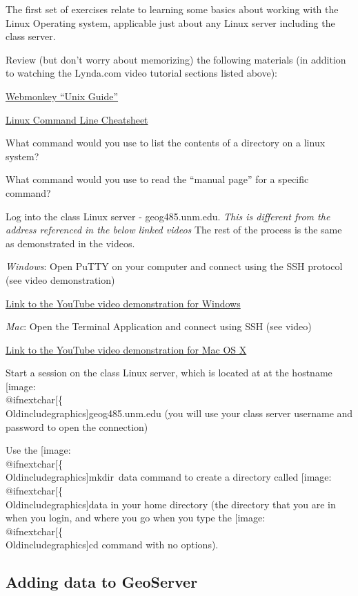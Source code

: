 \documentclass[]{book}
\makeatletter
\providecommand{\tightlist}{%
  \setlength{\itemsep}{0pt}\setlength{\parskip}{0pt}}
\def\ScaleIfNeeded{%
  \ifdim\Gin@nat@width>.5\linewidth
    .5\linewidth
  \else
    \Gin@nat@width
  \fi
}
\let\Oldincludegraphics\texttt{[image: \%
 \\catcode`\\@=11\\relax\%
 \%\\gdef\\includegraphics\{\\@ifnextchar[\{\\Oldincludegraphics]}{\Oldincludegraphics[width=\ScaleIfNeeded]}}%
\gdef\texttt{[image: \\@ifnextchar[\{\\Oldincludegraphics]}{\Oldincludegraphics[max size={.75\textwidth}{.75\textheight}]}}%
\makeatother
\begin{document}
The first set of exercises relate to learning some basics about working
with the Linux Operating system, applicable just about any Linux server
including the class server.

Review (but don't worry about memorizing) the following materials (in
addition to watching the Lynda.com video tutorial sections listed
above):

\href{http://www.webmonkey.com/2010/02/unix-guide/}{Webmonkey ``Unix
Guide''}

\href{http://www.cheatography.com/davechild/cheat-sheets/linux-command-line/}{Linux
Command Line Cheatsheet}

\begin{description}
\tightlist
\item[QUESTION 1]
What command would you use to list the contents of a directory on a
linux system?
\item[QUESTION 2]
What command would you use to read the ``manual page'' for a specific
command?
\end{description}

Log into the class Linux server - geog485.unm.edu. \emph{This is
different from the address referenced in the below linked videos} The
rest of the process is the same as demonstrated in the videos.

\emph{Windows}: Open PuTTY on your computer and connect using the SSH
protocol (see video demonstration)

\href{http://youtu.be/GdO_n89mey8}{Link to the YouTube video
demonstration for Windows}

\emph{Mac}: Open the Terminal Application and connect using SSH (see
video)

\href{http://youtu.be/Gu_ij6HxTWo}{Link to the YouTube video
demonstration for Mac OS X}

Start a session on the class Linux server, which is located at at the
hostname \texttt{geog485.unm.edu} (you will use your class server
username and password to open the connection)

\begin{description}
\tightlist
\item[Task]
Use the \texttt{mkdir\ data} command to create a directory called
\texttt{data} in your home directory (the directory that you are in when
you login, and where you go when you type the \texttt{cd} command with
no options).
\end{description}

\subsection{Adding data to GeoServer}\label{adding-data-to-geoserver}
\end{document}
